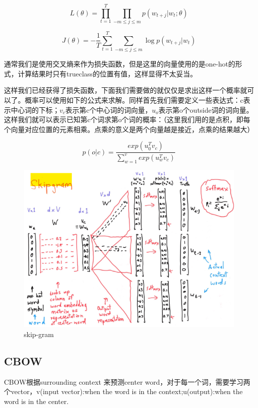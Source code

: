 	\begin{equation}
		L(\theta) = \prod_{t=1}^{T} \prod_{-m \leq j \leq m} p(w_{t+j}|w_t;\theta)
	\end{equation}
	
	\begin{equation}
		J(\theta) = -\frac{1}{T} \sum_{t=1}^{T} \sum_{-m \leq j \leq m} \log p(w_{t+j}|w_t)
	\end{equation}
	
	通常我们是使用交叉熵来作为损失函数，但是这里的向量使用的是one-hot的形式，计算结果时只有trueclass的位置有值，这样显得不太妥当。
	
	这样我们已经获得了损失函数，下面我们需要做的就仅仅是求出这样一个概率就可以了。概率可以使用如下的公式来求解。同样首先我们需要定义一些表达式：c表示中心词的下标；$v_c$表示第c个中心词的词向量，$u_o$表示第o个outside词的词向量。这样我们就可以表示已知第c个词求第o个词的概率：（这里我们用的是点积，即每个向量对应位置的元素相乘。点乘的意义是两个向量越是接近，点乘的结果越大）
	
	\begin{equation}
	p(o|c) = \frac{exp(u_0^T v_c)}{\sum_{w=1}^v exp(u_w^T v_c)}
	\end{equation}
	
	\begin{figure}[htbp]
	\centering\includegraphics[width=6in]{img/6-4.png}
	\caption{skip-gram}\label{fig:6-4}
	\end{figure}
		
	
	
	
	
	
	\subsection{CBOW}
	CBOW根据surrounding context 来预测center word，对于每一个词，需要学习两个vector，v(input vector):when the word is in the context;u(output):when the word is in the center.
	
